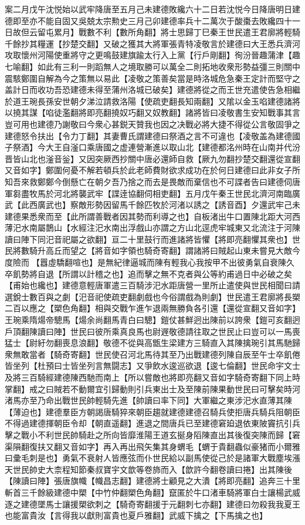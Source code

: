 案二月戊午沈悦始以武牢降唐至五月己未建德敗纔六十二日若沈悦今日降唐明日建德即至亦不能自固又吳兢太宗勲史三月己卯建德率兵十二萬次于酸棗去敗纔四十一日故但云留屯累月】戰數不利【數所角翻】將士思歸丁巳秦王世民遣王君廓將輕騎千餘抄其糧運【抄楚交翻】又破之獲其大將軍張青特凌敬言於建德曰大王悉兵濟河攻取懷州河陽使重將守之更鳴鼓建旗踰太行入上黨【行戶剛翻】徇汾晉趣蒲津【趣七喻翻】如此有三利一則蹈無人之境取勝可以萬全二則拓地收衆形勢益彊三則關中震駭鄭圍自解為今之策無以易此【凌敬之策善矣當是時洛城危急秦王定計而堅守之盖計日而收功吾恐建德未得至蒲州洛城已破矣】建德將從之而王世充遣使告急相繼於道王琬長孫安世朝夕涕泣請救洛陽【使疏吏翻長知兩翻】又隂以金玉啗建德諸將以撓其謀【啗徒濫翻將即亮翻撓奴巧翻又奴教翻】諸將皆曰凌敬書生安知戰事其言豈可用也建德乃謝敬曰今衆心甚鋭天贊我也因之决戰必將大捷不得從公言敬固爭之建德怒令扶出【令力丁翻】其妻曹氏謂建德曰祭酒之言不可違也【凌敬盖為建德國子祭酒】今大王自滏口乘唐國之虚連營漸進以取山北【建德都洺州時在山南并代汾晋皆山北也滏音釡】又因突厥西抄關中唐必還師自救【厥九勿翻抄楚交翻還從宣翻又音如字】鄭圍何憂不解若頓兵於此老師費財欲求成功在於何日建德曰此非女子所知吾來救鄭鄭今倒懸亡在朝夕吾乃捨之而去是畏敵而棄信也不可諜者告曰建德伺唐軍芻盡牧馬於河北將襲武牢【諜逹協翻伺相吏翻】五月戊午秦王世民北濟河南臨廣武【此西廣武也】察敵形勢因留馬千餘匹牧於河渚以誘之【誘音酉】夕還武牢己未建德果悉衆而至【此所謂善戰者因其勢而利導之也】自板渚出牛口置陳北距大河西薄汜水南屬鵲山【水經注汜水南出浮戲山亦謂之方山北逕虎牢城東又北流注于河陳讀曰陣下同汜音祀屬之欲翻】亘二十里鼓行而進諸將皆懼【將即亮翻懼其衆也】世民將數騎升高丘而望之【將音如字領也騎奇寄翻】謂諸將曰賊起山東未嘗見大敵今度險而【囂虛驕翻喧也】是無紀律逼城而陳有輕我心我按甲不出彼勇氣自衰陳久卒飢勢將自退【所謂以計稽之也】追而擊之無不克者與公等約甫過日中必破之矣【甫始也纔也】建德意輕唐軍遣三百騎涉汜水距唐營一里所止遣使與世民相聞曰請選銳士數百與之劇【汜音祀使疏吏翻劇戲也今俗謂戲為則劇】世民遣王君廓將長槊二百以應之【槊色角翻】相與交戰乍進乍退兩無勝負各引還【還從宣翻又音如字】王琬乘隋煬帝驄馬【煬余尚翻馬青白曰驄】鎧仗甚鮮迥出陳前以誇衆【鎧可亥翻迥戶頂翻陳讀曰陣】世民曰彼所乘真良馬也尉遟敬德請往取之世民止曰豈可以一馬喪猛士【尉紆勿翻喪息浪翻】敬德不從與高甑生梁建方三騎直入其陳擒琬引其馬馳歸衆無敢當者【騎奇寄翻】世民使召河北馬待其至乃出戰建德列陳自辰至午士卒飢倦皆坐列【杜預曰士皆坐列言無闘志】又爭飲水逡巡欲退【逡七倫翻】世民命宇文士及將三百騎經建德陳西馳而南上【所以嘗敵也將即亮翻又音如字騎奇寄翻下同上時掌翻】戒之曰賊若不動爾宜引歸動則引兵東出士及至陳前陳果動世民曰可擊矣時河渚馬亦至乃命出戰世民帥輕騎先進【帥讀曰率下同】大軍繼之東涉汜水直薄其陳【薄迫也】建德羣臣方朝謁唐騎猝來朝臣趨就建德建德召騎兵使拒唐兵騎兵阻朝臣不得過建德揮朝臣令却【朝直遥翻】進退之間唐兵已至建德窘廹退依東陂竇抗引兵擊之戰小不利世民帥騎赴之所向皆靡淮陽王道玄挻身䧟陳直出其後復突陳而歸【窘渠隕翻復扶又翻又音如字】再入再出飛矢集其身蝟毛【蝟于貴翻蟲似豪猪而小爾雅曰彚毛刺是也】勇氣不衰射人皆應弦而仆世民給以副馬使從己於是諸軍大戰塵埃漲天世民帥史大柰程知節秦叔寶宇文歆等卷斾而入【歆許今翻卷讀曰捲】出其陳後【陳讀曰陣】張唐旗幟【幟昌志翻】建德將士顧見之大潰【將即亮翻】追奔三十里斬首三千餘級建德中槊【中竹仲翻槊色角翻】竄匿於牛口渚車騎將軍白士讓楊武威逐之建德墜馬士讓援槊欲刺之【騎奇寄翻援于元翻刺七亦翻】建德曰勿殺我我夏王也能富貴汝【言得我以獻則富貴也夏戶雅翻】武威下擒之【下馬擒之也】